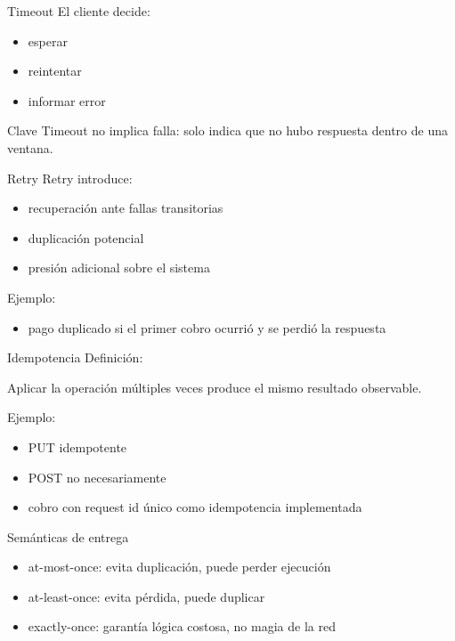 \documentclass[institutional,screen,none]{ua-engineering-v6-beamer}
\begin{document}
\begin{frame}{Timeout}
El cliente decide:

\begin{itemize}
\item esperar
\item reintentar
\item informar error
\end{itemize}

\begin{block}{Clave}
Timeout no implica falla: solo indica que no hubo respuesta dentro de una ventana.
\end{block}
\end{frame}

\begin{frame}{Retry}
Retry introduce:

\begin{itemize}
\item recuperación ante fallas transitorias
\item duplicación potencial
\item presión adicional sobre el sistema
\end{itemize}

Ejemplo:
\begin{itemize}
\item pago duplicado si el primer cobro ocurrió y se perdió la respuesta
\end{itemize}
\end{frame}

\begin{frame}{Idempotencia}
Definición:

\begin{block}{}
Aplicar la operación múltiples veces produce el mismo resultado observable.
\end{block}

Ejemplo:
\begin{itemize}
\item PUT idempotente
\item POST no necesariamente
\item cobro con request id único como idempotencia implementada
\end{itemize}
\end{frame}

\begin{frame}{Semánticas de entrega}
\begin{itemize}
\item at-most-once: evita duplicación, puede perder ejecución
\item at-least-once: evita pérdida, puede duplicar
\item exactly-once: garantía lógica costosa, no magia de la red
\end{itemize}
\end{frame}
\end{document}
